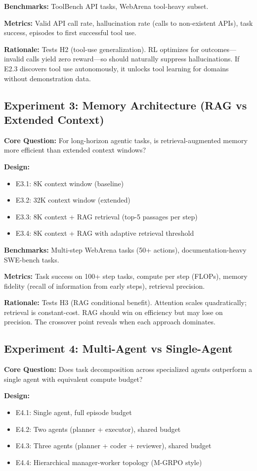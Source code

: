 \documentclass[12pt,a4paper]{report}
\theoremstyle{definition}
\begin{document}
\textbf{Benchmarks:} ToolBench API tasks, WebArena tool-heavy subset.

\textbf{Metrics:} Valid API call rate, hallucination rate (calls to non-existent APIs), task success, episodes to first successful tool use.

\textbf{Rationale:} Tests H2 (tool-use generalization). RL optimizes for outcomes---invalid calls yield zero reward---so should naturally suppress hallucinations. If E2.3 discovers tool use autonomously, it unlocks tool learning for domains without demonstration data.

\subsection{Experiment 3: Memory Architecture (RAG vs Extended Context)}
\textbf{Core Question:} For long-horizon agentic tasks, is retrieval-augmented memory more efficient than extended context windows?

\textbf{Design:}
\begin{itemize}
    \item E3.1: 8K context window (baseline)
    \item E3.2: 32K context window (extended)
    \item E3.3: 8K context + RAG retrieval (top-5 passages per step)
    \item E3.4: 8K context + RAG with adaptive retrieval threshold
\end{itemize}

\textbf{Benchmarks:} Multi-step WebArena tasks (50+ actions), documentation-heavy SWE-bench tasks.

\textbf{Metrics:} Task success on 100+ step tasks, compute per step (FLOPs), memory fidelity (recall of information from early steps), retrieval precision.

\textbf{Rationale:} Tests H3 (RAG conditional benefit). Attention scales quadratically; retrieval is constant-cost. RAG should win on efficiency but may lose on precision. The crossover point reveals when each approach dominates.

\subsection{Experiment 4: Multi-Agent vs Single-Agent}
\textbf{Core Question:} Does task decomposition across specialized agents outperform a single agent with equivalent compute budget?

\textbf{Design:}
\begin{itemize}
    \item E4.1: Single agent, full episode budget
    \item E4.2: Two agents (planner + executor), shared budget
    \item E4.3: Three agents (planner + coder + reviewer), shared budget
    \item E4.4: Hierarchical manager-worker topology (M-GRPO style)
\end{itemize}
\end{document}

